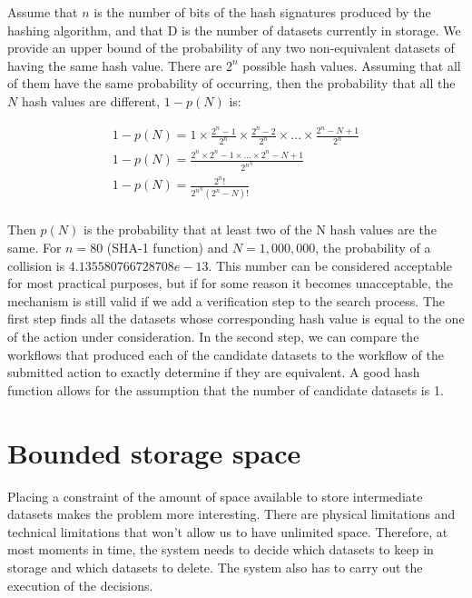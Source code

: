Assume that $n$ is the number of bits of the hash signatures produced by the hashing algorithm, and that D is the number of datasets currently in storage.  We provide an upper bound of the probability of any two non-equivalent datasets of having the same hash value.  There are $2^n$ possible hash values.  Assuming that all of them have the same probability of occurring, then the probability that all the $N$ hash values are different, $1 - p(N)$ is:

\begin{multline}
	1 - p(N) = 1 \times \frac{2^n - 1}{2^n} \times \frac{2^n - 2}{2^n} \times . . . \times \frac{2^n - N + 1}{2^n} \\ 
	1 - p(N) = \frac{2^n \times 2^n - 1 \times . . . \times 2^n - N + 1}{2^{n^{N}}} \\ 
	1 - p(N) = \frac{2^n !}{2^{n{^N}} (2^n - N)!} \\
\end{multline}

Then $p(N)$ is the probability that at least two of the N hash values are the same.  For $n=80$ (SHA-1 function) and $N=1,000,000$, the probability of a collision is $4.135580766728708e-13$.  This number can be considered acceptable for most practical purposes, but if for some reason it becomes unacceptable, the mechanism is still valid if we add a verification step to the search process.  The first step finds all the datasets whose corresponding hash value is equal to the one of the action under consideration.  In the second step, we can compare the workflows that produced each of the candidate  datasets to the workflow of the submitted action to exactly determine if they are equivalent.  A good hash function allows for the assumption that the number of candidate datasets is 1.

\section{Bounded storage space}
Placing a constraint of the amount of space available to store intermediate datasets makes the problem more interesting. There are physical limitations and technical limitations that won't allow us to have unlimited space.  Therefore, at most moments in time, the system needs to decide which datasets to keep in storage and which datasets to delete. The system also has to carry out the execution of the decisions.

